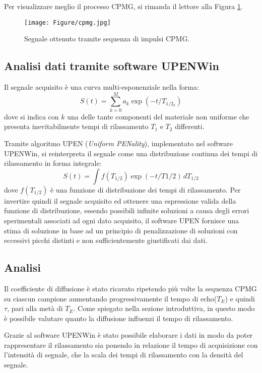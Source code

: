Per visualizzare meglio il processo CPMG, si rimanda il lettore alla Figura \ref{fig:cpmg}.

\begin{figure}[h!]
\centering
\texttt{[image: Figure/cpmg.jpg]}
\caption{Segnale ottenuto tramite sequenza di impulsi CPMG.}
\label{fig:cpmg}
\end{figure}


\subsection*{Analisi dati tramite software UPENWin\cite{UpenWIN}}

Il segnale acquisito è una curva multi-esponenziale nella forma:
\begin{equation}
	S(t) = \sum_{k=0}^M a_k \exp(-t/T_{1/2_k})
\end{equation}
dove si indica con $k$ una delle tante componenti del materiale non uniforme che presenta inevitabilmente tempi di rilassamento $T_1$ e $T_2$ differenti.

Tramite algoritmo UPEN (\textit{Uniform PENality}), implementato nel software UPENWin, si reinterpreta il segnale come una distribuzione continua dei tempi di rilassamento in forma integrale:
\begin{equation}
	S(t) = \int f(T_{1/2}) \exp(-t/T{1/2}) \, dT_{1/2}
\end{equation}
dove $f(T_{1/2})$ è una funzione di distribuzione dei tempi di rilassamento. Per invertire quindi il segnale acquisito ed ottenere una espressione valida della funzione di distribuzione, essendo possibili infinite soluzioni a causa degli errori sperimentali associati ad ogni dato acquisito, il software UPEN fornisce una stima di soluzione in base ad un principio di penalizzazione di soluzioni con eccessivi picchi distinti e non sufficientemente giustificati dai dati.

\subsection*{Analisi}

Il coefficiente di diffusione è stato ricavato ripetendo più volte la sequenza CPMG su ciascun campione aumentando progressivamente il tempo di echo($T_E$) e quindi $\tau$, pari alla metà di $T_E$.
Come spiegato nella sezione introduttiva, in questo modo è possibile  valutare quanto la diffusione influenzi il tempo di rilassamento.

Grazie al software UPENWin è stato possibile elaborare i dati in modo da poter rappresentare il rilassamento sia ponendo in relazione il tempo di acquisizione con l'intensità di segnale, che la scala dei tempi di rilassamento con la densità del segnale.

